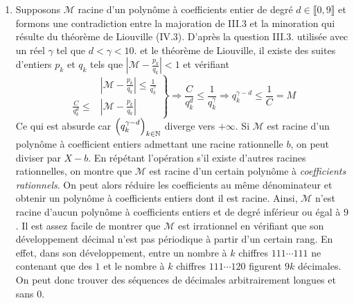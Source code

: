 \begin{enumerate}
\item Supposons $\mathcal{M}$ racine d'un polynôme à coefficients entier de degré $d\in \llbracket 0, 9\rrbracket$ et formons une contradiction entre la majoration de III.3 et la minoration qui résulte du théorème de Liouville (IV.3). 
D'après la question III.3. utilisée avec un réel $\gamma$ tel que $d<\gamma<10$. et le théorème de Liouville, il existe des suites d'entiers $p_k$ et $q_k$ tels que $\left|\mathcal{M}-\frac{p_k}{q_k}\right|<1$ et vérifiant 
\begin{displaymath}
\left. 
\begin{aligned}
  &\left|\mathcal{M}-\frac{p_k}{q_k}\right| \leq \frac{1}{q_k^\gamma}\\
  \frac{C}{q_k^d} \leq &\left|\mathcal{M}-\frac{p_k}{q_k}\right|  
\end{aligned}
\right\rbrace \Rightarrow
 \frac{C}{q_k^d} \leq  \frac{1}{q_k^\gamma}
 \Rightarrow q_k^{\gamma -d} \leq \frac{1}{C} = M
\end{displaymath}
Ce qui est absurde car $\left( q_k^{\gamma -d}\right)_{k\in \mathbb{N}}$ diverge vers $+\infty$.\newline
Si $\mathcal M$ est racine d'un polynôme à coefficient entiers admettant une racine rationnelle $b$, on peut diviser par $X-b$. En répétant l'opération s'il existe d'autres racines rationnelles, on montre que $\mathcal M$  est racine d'un certain polynôme à \emph{coefficients rationnels}. On peut alors réduire les coefficients au même dénominateur et obtenir un polynôme à coefficients entiers dont il est racine.
 Ainsi, $\mathcal M$ n'est racine d'aucun polynôme à coefficients entiers et de degré inférieur ou égal à $9$.\newline
Il est assez facile de montrer que $\mathcal M$ est irrationnel en vérifiant que son développement décimal n'est pas périodique à partir d'un certain rang. En effet, dans son développement, entre un nombre à $k$ chiffres $111\cdots111$ ne contenant que des $1$ et le nombre à $k$ chiffres $111\cdots120$ figurent $9k$ décimales. On peut donc trouver des séquences de décimales arbitrairement longues et sans $0$.
\end{enumerate}